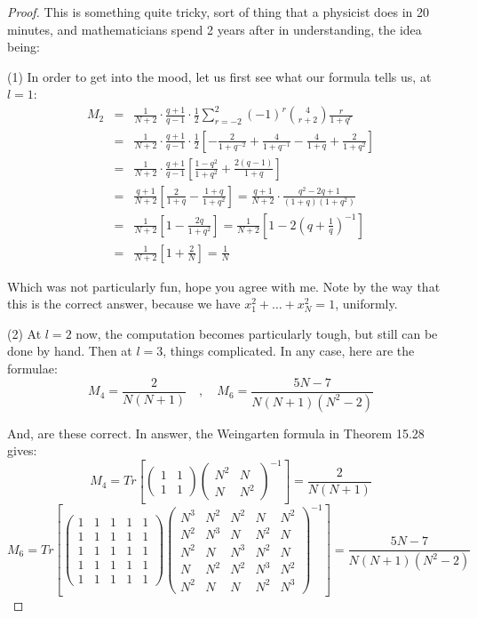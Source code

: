 \documentclass[12pt]{amsbook}
\begin{document}
\begin{proof}
This is something quite tricky, sort of thing that a physicist does in 20 minutes, and mathematicians spend 2 years after in understanding, the idea being:

\medskip

(1) In order to get into the mood, let us first see what our formula tells us, at $l=1$:
\begin{eqnarray*}
M_2
&=&\frac{1}{N+2}\cdot\frac{q+1}{q-1}\cdot\frac{1}{2}\sum_{r=-2}^2(-1)^r\binom{4}{r+2}\frac{r}{1+q^r}\\
&=&\frac{1}{N+2}\cdot\frac{q+1}{q-1}\cdot\frac{1}{2}\left[-\frac{2}{1+q^{-2}}+\frac{4}{1+q^{-1}}-\frac{4}{1+q}+\frac{2}{1+q^2}\right]\\
&=&\frac{1}{N+2}\cdot\frac{q+1}{q-1}\left[\frac{1-q^2}{1+q^2}+\frac{2(q-1)}{1+q}\right]\\
&=&\frac{q+1}{N+2}\left[\frac{2}{1+q}-\frac{1+q}{1+q^2}\right]
=\frac{q+1}{N+2}\cdot\frac{q^2-2q+1}{(1+q)(1+q^2)}\\
&=&\frac{1}{N+2}\left[1-\frac{2q}{1+q^2}\right]
=\frac{1}{N+2}\left[1-2\left(q+\frac{1}{q}\right)^{-1}\right]\\
&=&\frac{1}{N+2}\left[1+\frac{2}{N}\right]=\frac{1}{N}
\end{eqnarray*}

Which was not particularly fun, hope you agree with me. Note by the way that this is the correct answer, because we have $x_1^2+\ldots+x_N^2=1$, uniformly.

\medskip

(2) At $l=2$ now, the computation becomes particularly tough, but still can be done by hand. Then at $l=3$, things complicated. In any case, here are the formulae:
$$M_4=\frac{2}{N(N+1)}\quad,\quad 
M_6=\frac{5N-7}{N(N+1)(N^2-2)}$$

And, are these correct. In answer, the Weingarten formula in Theorem 15.28 gives:
$$M_4=Tr\left[\begin{pmatrix}1&1\\1&1\end{pmatrix}
\begin{pmatrix}N^2&N\\N&N^2\end{pmatrix}^{-1}\right]
=\frac{2}{N(N+1)}$$
$$M_6=Tr\left[\begin{pmatrix}
1&1&1&1&1\\
1&1&1&1&1\\
1&1&1&1&1\\
1&1&1&1&1\\
1&1&1&1&1
\end{pmatrix}
\begin{pmatrix}
N^3&N^2&N^2&N&N^2\\
N^2&N^3&N&N^2&N\\
N^2&N&N^3&N^2&N\\
N&N^2&N^2&N^3&N^2\\
N^2&N&N&N^2&N^3
\end{pmatrix}^{-1}\right]
=\frac{5N-7}{N(N+1)(N^2-2)}$$


\end{proof}
\end{document}
